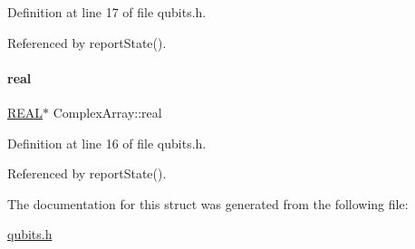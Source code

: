 Definition at line 17 of file qubits.\+h.



Referenced by report\+State().

\mbox{\label{structComplexArray_a4195cac6c784ea1b6271f1c7dba1548a}} 
\paragraph{\texorpdfstring{real}{real}}
{\footnotesize\ttfamily \mbox{\hyperlink{precision_8h_a4b654506f18b8bfd61ad2a29a7e38c25}{R\+E\+AL}}$\ast$ Complex\+Array\+::real}



Definition at line 16 of file qubits.\+h.



Referenced by report\+State().



The documentation for this struct was generated from the following file\+:\begin{DoxyCompactItemize}
\item 
\mbox{\hyperlink{qubits_8h}{qubits.\+h}}\end{DoxyCompactItemize}
